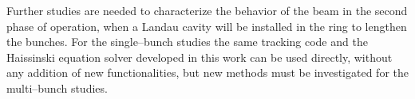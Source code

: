    Further studies are needed to characterize the behavior of the beam in the second phase of operation, when a Landau cavity will be installed in the ring to lengthen the bunches. For the single--bunch studies the same tracking code and the Haissinski equation solver developed in this work can be used directly, without any addition of new functionalities, but new methods must be investigated for the multi--bunch studies.

\postextual

% 
% 
% 



%
%
%
%
